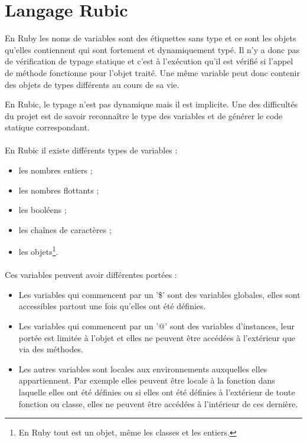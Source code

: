\documentclass[12pt]{article}
\begin{document}
\section{Langage Rubic}

En Ruby les noms de variables sont des étiquettes sans type et ce sont les
objets qu'elles contiennent qui sont fortement et dynamiquement typé. Il n'y a
donc pas de vérification de typage statique et c'est à l'exécution qu'il est
vérifié si l'appel de méthode fonctionne pour l'objet traité. Une même
variable peut donc contenir des objets de types différents au cours de sa vie.

En Rubic, le typage n'est pas dynamique mais il est implicite. Une des
difficultés du projet est de savoir reconnaître le type des variables et de
générer le code statique correspondant.

\paragraph{} En Rubic il existe différents types de variables :
\begin{itemize}
    \item les nombres entiers ;
    \item les nombres flottants ;
    \item les booléens ;
    \item les chaînes de caractères ;
    \item les objets\footnote{En Ruby tout est un objet, même les classes et
        les entiers.}.
\end{itemize}

\paragraph{}
Ces variables peuvent avoir différentes portées :
\begin{itemize}
    \item Les variables qui commencent par un '\$' sont des variables
        globales, elles sont accessibles partout une fois qu'elles ont été
        définies.
    \item Les variables qui commencent par un '@' sont des variables
        d'instances, leur portée est limitée à l'objet et elles ne peuvent
        être accédées à l'extérieur que via des méthodes.
    \item Les autres variables sont locales aux environnements auxquelles
        elles appartiennent. Par exemple elles peuvent être locale à la
        fonction dans laquelle elles ont été définies ou si elles ont été
        définies à l'extérieur de toute fonction ou classe, elles ne peuvent
        être accédées à l'intérieur de ces dernière.
\end{itemize}
\end{document}
